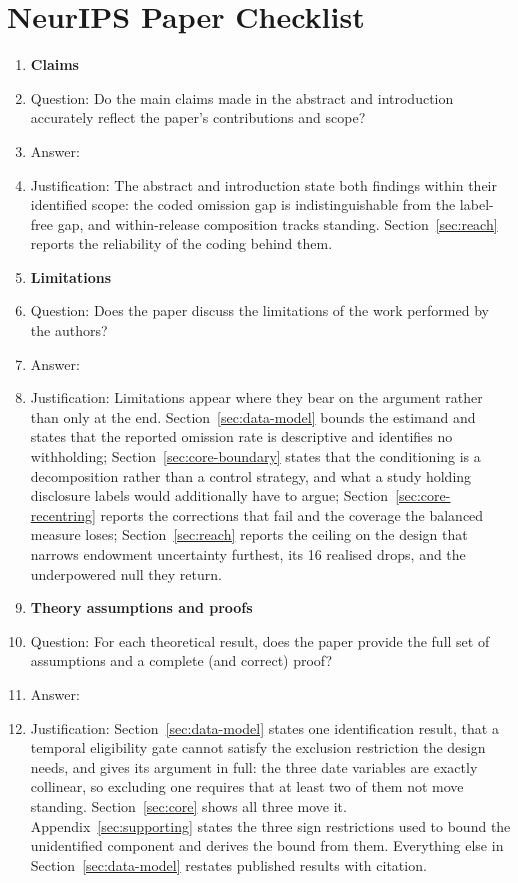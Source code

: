 \documentclass{article}
\begin{document}
\newpage
\section*{NeurIPS Paper Checklist}

\begin{enumerate}

\item {\bf Claims}
    \item[] Question: Do the main claims made in the abstract and introduction accurately reflect the paper's contributions and scope?
    \item[] Answer: \answerYes{}
    \item[] Justification: The abstract and introduction state both findings within their identified scope: the coded omission gap is indistinguishable from the label-free gap, and within-release composition tracks standing. Section~\ref{sec:reach} reports the reliability of the coding behind them.


\item {\bf Limitations}
    \item[] Question: Does the paper discuss the limitations of the work performed by the authors?
    \item[] Answer: \answerYes{}
    \item[] Justification: Limitations appear where they bear on the argument rather than only at the end. Section~\ref{sec:data-model} bounds the estimand and states that the reported omission rate is descriptive and identifies no withholding; Section~\ref{sec:core-boundary} states that the conditioning is a decomposition rather than a control strategy, and what a study holding disclosure labels would additionally have to argue; Section~\ref{sec:core-recentring} reports the corrections that fail and the coverage the balanced measure loses; Section~\ref{sec:reach} reports the ceiling on the design that narrows endowment uncertainty furthest, its 16 realised drops, and the underpowered null they return.


\item {\bf Theory assumptions and proofs}
    \item[] Question: For each theoretical result, does the paper provide the full set of assumptions and a complete (and correct) proof?
    \item[] Answer: \answerYes{}
    \item[] Justification: Section~\ref{sec:data-model} states one identification result, that a temporal eligibility gate cannot satisfy the exclusion restriction the design needs, and gives its argument in full: the three date variables are exactly collinear, so excluding one requires that at least two of them not move standing. Section~\ref{sec:core} shows all three move it. Appendix~\ref{sec:supporting} states the three sign restrictions used to bound the unidentified component and derives the bound from them. Everything else in Section~\ref{sec:data-model} restates published results with citation.



\end{enumerate}
\end{document}
